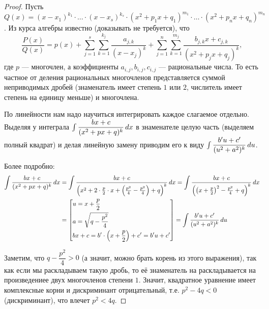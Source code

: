 \documentclass[a4paper]{article}
\theoremstyle{named}
\renewcommand{\int}{\intop}
\begin{document}
        \begin{proof}
            Пусть $Q(x) = (x - x_1)^{k_1} \cdot \dots \cdot (x - x_s)^{k_s} \cdot (x^2 + p_1x + q_1)^{m_1} \cdot \dots \cdot (x^2 + p_nx + q_n)^{m_n}$. Из курса алгебры известно (доказывать не требуется), что
            \begin{equation*}
                \dfrac{P(x)}{Q(x)} = p(x) + \sum_{j = 1}^s \sum_{k = 1}^{k_j} \dfrac{a_{j, k}}{(x - x_j)^k} + \sum_{j = 1}^n \sum_{k = 1}^{m_j} \dfrac{b_{j, k}x + c_{j, k}}{(x^2 + p_jx + q_j)^k},
            \end{equation*}
            где $p$ --- многочлен, а коэффициенты $a_{i, j}, b_{i, j}, c_{i, j}$ --- рациональные числа. То есть частное от деления рациональных многочленов представляется суммой неприводимых дробей (знаменатель имеет степень $1$ или $2$, числитель имеет степень на единицу меньше) и многочлена.

            По линейности нам надо научиться интегрировать каждое слагаемое отдельно. Выделяя у интеграла $\int \dfrac{bx + c}{(x^2 + px + q)^k} \dd x$ в знаменателе целую часть (выделяем полный квадрат) и делая линейную замену приводим его к виду $\int \dfrac{b'u + c'}{(u^2 + a^2)^k} \dd u$. 

            Более подробно:
            \begin{align*}
                \int \dfrac{bx + c}{(x^2 + px + q)^k} \dd x 
                &= \int \dfrac{bx + c}{\left(x^2 + 2 \cdot \frac{p}{2} \cdot x + \left(\frac{p^2}{4} - \frac{p^2}{4}\right) + q\right)^k} \dd x
                = \int \dfrac{bx + c}{\left(\left(x + \frac{p}{2}\right)^2 - \frac{p^2}{4} + q\right)^k} \dd x \\
                &= \left[\begin{aligned}
                    &u = x + \dfrac{p}{2} \\
                    &a = \sqrt{q - \dfrac{p^2}{4}}\\
                    &bx + c = b' \cdot \left(x + \frac{p}{2}\right) + c' = b'u + c' \\
                \end{aligned}\right]
                = \int \dfrac{b'u + c'}{(u^2 + a^2)^k} \dd u
            \end{align*}

            Заметим, что $q - \dfrac{p^2}{4} > 0$ (а значит, можно брать корень из этого выражения), так как если мы раскладываем такую дробь, то её знаменатель на раскладывается на произведениее двух многочленов степени $1$. Значит, квадратное уравнение имеет комплексные корни и дискриминант отрицательный, т.е. $p^2 - 4q < 0$ (дискриминант), что влечет $p^2 < 4q$.


\end{proof}
\end{document}
